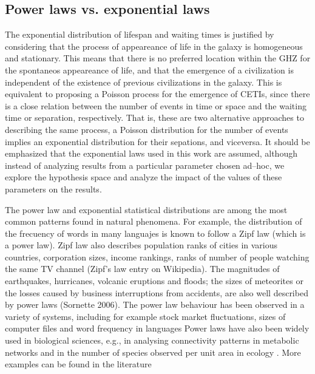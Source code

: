 \documentclass[crop]{CSLB}%
\begin{document}
\subsection{Power laws vs. exponential laws}\label{SS_PDF_shape}

The exponential distribution of lifespan and waiting times is
justified by considering that the process of appeareance of life in
the galaxy is homogeneous and stationary.
%
This means that there is no preferred location within the GHZ for the
spontaneos appeareance of life, and that the emergence of a
civilization is independent of the existence of previous civilizations 
in the galaxy.
%            
This is equivalent to proposing a Poisson process for the emergence of
CETIs, since there is a close relation between the number of events in
time or space and the waiting time or separation, respectively.
%
That is, these are two alternative approaches to describing the same
process, a Poisson distribution for the number of events implies an
exponential distribution for their sepations, and viceversa.
%
It should be emphasized that the exponential laws used in this work
are assumed, although instead of analyzing results from a particular
parameter chosen ad--hoc, we explore the hypothesis space and analyze
the impact of the values of these parameters on the results.
%                                                           

The power law and exponential statistical distributions are among the
most common patterns found in natural phenomena.
%
For example, the distribution of the frecuency of words in many
languajes is known to follow a Zipf law (which is a power law).
%
Zipf law also describes population ranks of cities in various
countries, corporation sizes, income rankings, ranks of number of
people watching the same TV channel (Zipf's law entry on Wikipedia).
%
The magnitudes of earthquakes, hurricanes, volcanic eruptions and
floods; the sizes of meteorites or the losses caused by business
interruptions from accidents, are also well described by power laws
(Sornette 2006).
%
The power law behaviour has been observed in a variety of systems,
including for example stock market fluctuations, sizes of computer
files and word frequency in languages \citep{mitzenmacher_brief_2004,
newman_power_2005, simkin_theory_2006}
%
Power laws have also been widely used in biological sciences, e.g., in
analysing connectivity patterns in metabolic networks
\citep{jeong_large_2000} and in the number of species observed per
unit area in ecology \citep{martin_origin_2006, frank_common_2009}.
% 
More examples can be found in the literature
\citep{martin_origin_2006, maccone_KLT_2010, barabasi_scale_2009,
maccone_evolution_2014, maccone_lognormals_2014,
benguigui_classificacion_2016}
 
\end{document}
